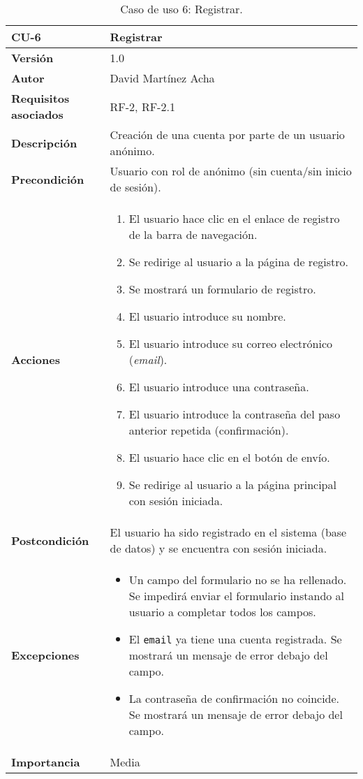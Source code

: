 \begin{table}[p]
	\centering
	\begin{tabularx}{\linewidth}{ p{} p{} }
		\toprule
		\textbf{CU-6}    & \textbf{Registrar}\\
		\toprule
		\textbf{Versión}              & 1.0    \\
		\textbf{Autor}                & David Martínez Acha \\
		\textbf{Requisitos asociados} & RF-2, RF-2.1 \\
		\textbf{Descripción}          & Creación de una cuenta por parte de un usuario anónimo. \\
		\textbf{Precondición}         & Usuario con rol de anónimo (sin cuenta/sin inicio de sesión). \\
		\textbf{Acciones}             &
		\begin{enumerate}
			\def\labelenumi{\arabic{enumi}.}
			\tightlist
			\item El usuario hace clic en el enlace de registro de la barra de navegación.
			\item Se redirige al usuario a la página de registro.
			\item Se mostrará un formulario de registro.
			\item El usuario introduce su nombre.
			\item El usuario introduce su correo electrónico (\textit{email}).
			\item El usuario introduce una contraseña.
			\item El usuario introduce la contraseña del paso anterior repetida (confirmación).
            \item El usuario hace clic en el botón de envío.
			\item Se redirige al usuario a la página principal con sesión iniciada.
		\end{enumerate}\\
		\textbf{Postcondición}        & El usuario ha sido registrado en el sistema (base de datos) y se encuentra con sesión iniciada. \\
		\textbf{Excepciones}          & \begin{itemize}
			\item Un campo del formulario no se ha rellenado. Se impedirá enviar el formulario instando al usuario a completar todos los campos.
			\item El \texttt{email} ya tiene una cuenta registrada. Se mostrará un mensaje de error debajo del campo.
			\item La contraseña de confirmación no coincide. Se mostrará un mensaje de error debajo del campo.
		\end{itemize}\\
		\textbf{Importancia}          & Media \\
		\bottomrule
	\end{tabularx}
	\caption{Caso de uso 6: Registrar.}
\end{table}

